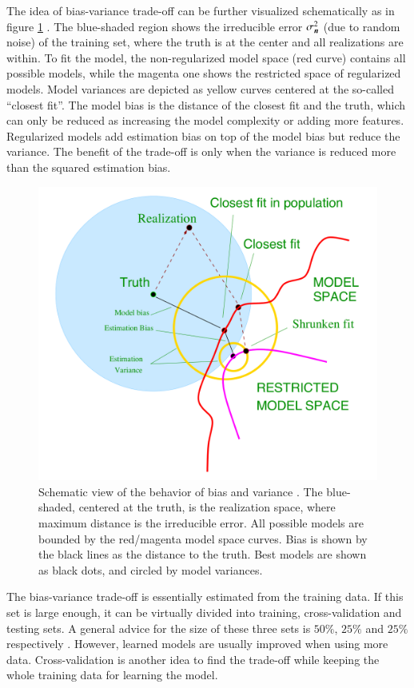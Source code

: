 The idea of bias-variance trade-off can be further visualized schematically as in figure \ref{fig:bias-variance} \citep{hastie2009elements}. The blue-shaded region shows the irreducible error $ \sigma_{\operatorname{\boldsymbol{n}}}^2 $ (due to random noise) of the training set, where the truth is at the center and all realizations are within. To fit the model, the non-regularized model space (red curve) contains all possible models, while the magenta one shows the restricted space of regularized models. Model variances are depicted as yellow curves centered at the so-called ``closest fit''. The model bias is the distance of the closest fit and the truth, which can only be reduced as increasing the model complexity or adding more features. Regularized models add estimation bias on top of the model bias but reduce the variance. The benefit of the trade-off is only when the variance is reduced more than the squared estimation bias.

\begin{figure}
\centering
	\includegraphics[width=0.6\columnwidth]{./images/regression/bias-variance.png}
	\caption{\label{fig:bias-variance} Schematic view of the behavior of bias and variance \citep{hastie2009elements}. The blue-shaded, centered at the truth, is the realization space, where maximum distance is the irreducible error. All possible models are bounded by the red/magenta model space curves. Bias is shown by the black lines as the distance to the truth. Best models are shown as black dots, and circled by model variances. }
\end{figure}

The bias-variance trade-off is essentially estimated from the training data. If this set is large enough, it can be virtually divided into training, cross-validation and testing sets. A general advice for the size of these three sets is $ 50 \% $, $ 25 \% $ and $ 25 \% $ respectively \citep{hastie2009elements}. However, learned models are usually improved when using more data. Cross-validation is another idea to find the trade-off while keeping the whole training data for learning the model. 

